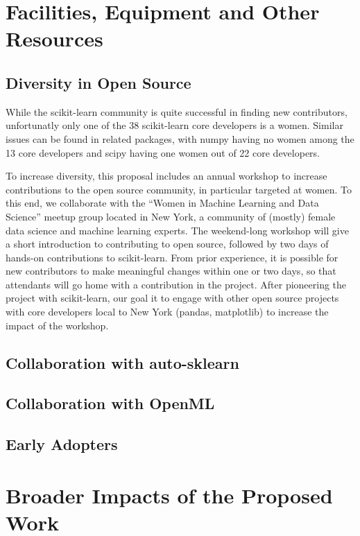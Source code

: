 \section{Facilities, Equipment and Other Resources}
\subsection{Diversity in Open Source}
While the scikit-learn community is quite successful in finding new contributors,
unfortunatly only one of the 38 scikit-learn core developers is a women.
Similar issues can be found in related packages, with numpy having no women among the 13 core
developers and scipy having one women out of 22 core developers.

To increase diversity, this proposal includes an annual workshop to increase
contributions to the open source community, in particular targeted at women.
To this end, we collaborate with the ``Women in Machine Learning and Data Science''
meetup group located in New York, a community of (mostly) female data science and
machine learning experts.
The weekend-long workshop will give a short introduction to contributing to open source,
followed by two days of hands-on contributions to scikit-learn.
From prior experience, it is possible for new contributors to make meaningful changes
within one or two days, so that attendants will go home with a contribution
in the project. After pioneering the project with scikit-learn, our goal
it to engage with other open source projects with core developers local to New York
(pandas, matplotlib) to increase the impact of the workshop.

\subsection{Collaboration with auto-sklearn}


\subsection{Collaboration with OpenML}
\subsection{Early Adopters}

\section{Broader Impacts of the Proposed Work}

